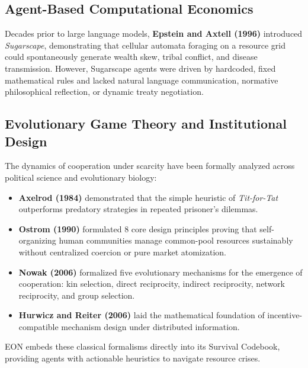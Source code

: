 \documentclass[11pt,a4paper]{article}
\begin{document}
\subsection{Agent-Based Computational Economics}
Decades prior to large language models, \textbf{Epstein and Axtell (1996)} \cite{epstein1996growing} introduced \textit{Sugarscape}, demonstrating that cellular automata foraging on a resource grid could spontaneously generate wealth skew, tribal conflict, and disease transmission. However, Sugarscape agents were driven by hardcoded, fixed mathematical rules and lacked natural language communication, normative philosophical reflection, or dynamic treaty negotiation.

\subsection{Evolutionary Game Theory and Institutional Design}
The dynamics of cooperation under scarcity have been formally analyzed across political science and evolutionary biology:
\begin{itemize}[leftmargin=*]
    \item \textbf{Axelrod (1984)} \cite{axelrod1984evolution} demonstrated that the simple heuristic of \textit{Tit-for-Tat} outperforms predatory strategies in repeated prisoner's dilemmas.
    \item \textbf{Ostrom (1990)} \cite{ostrom1990governing} formulated 8 core design principles proving that self-organizing human communities manage common-pool resources sustainably without centralized coercion or pure market atomization.
    \item \textbf{Nowak (2006)} \cite{nowak2006evolutionary} formalized five evolutionary mechanisms for the emergence of cooperation: kin selection, direct reciprocity, indirect reciprocity, network reciprocity, and group selection.
    \item \textbf{Hurwicz and Reiter (2006)} \cite{hurwicz2006designing} laid the mathematical foundation of incentive-compatible mechanism design under distributed information.
\end{itemize}
EON embeds these classical formalisms directly into its Survival Codebook, providing agents with actionable heuristics to navigate resource crises.
\end{document}

